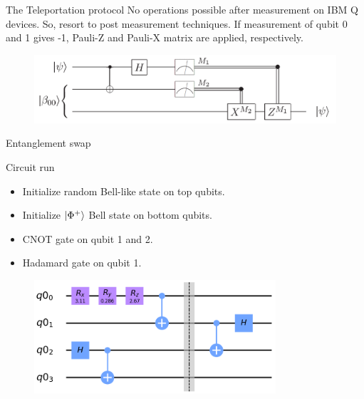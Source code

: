 \begin{frame}{The Teleportation protocol}
	No operations possible after measurement on IBM Q devices. So, resort to post measurement techniques. If measurement of qubit 0 and 1 gives -1, Pauli-Z  and Pauli-X matrix are applied, respectively.
	\vspace{0.5cm}
	\begin{figure}[h] \centering
		\includegraphics[width=\textwidth]{images/Teleport_general.png}
		\label{fig:tele_gen}
	\end{figure}
	
\end{frame}

\begin{frame}{Entanglement swap}
	
	\begin{block}{Circuit run}
		\begin{itemize}
			\item Initialize random Bell-like state on top qubits.
			\item Initialize $\ket{\Phi^+}$ Bell state on bottom qubits.
			\item CNOT gate on qubit 1 and 2.
			\item Hadamard gate on qubit 1.
		\end{itemize}
	\end{block}
	
	\begin{figure}[h] \centering
		\includegraphics[width=0.8\textwidth]{images/swap_circuit.png}
		\label{fig:swap_circ}
	\end{figure}
	
\end{frame}

